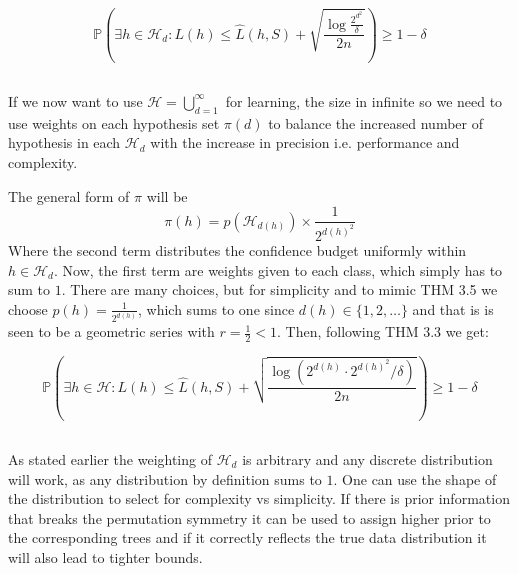 \documentclass[a4paper,12pt]{article}
\begin{document}
$$
\mathbb{P}\left( \exists h \in \mathcal{H}_d :   L(h) \leq \hat{L}(h,S) + 
\sqrt{
\frac{\log \frac{2^{d^2}}{\delta}}{2n}
} 
\right) \geq 1-\delta
$$



\subsection{} %

If we now want to use $\mathcal{H} = \bigcup_{d=1}^\infty$ for learning, the size in infinite so we need to use weights on each hypothesis set $\pi(d)$ to balance the increased number of hypothesis in each $\mathcal{H}_d$ with the increase in precision i.e. performance and complexity.

The general form of $\pi$ will be 
$$
\pi(h) = p\left( \mathcal{H}_{ d(h) } \right) \times \frac{1}{2^{d(h)^2}} 
$$
Where the second term distributes the confidence budget uniformly within $h \in \mathcal{H}_d$. Now, the first term are weights given to each class, which simply has to sum to $1$. There are many choices, but for simplicity and to mimic THM 3.5 we choose $p(h) = \frac{1}{2^{d(h)}}$, which sums to one since $d(h) \in \{1,2,\dots\}$ and that is is seen to be a geometric series with $r = \frac{1}{2} < 1$. Then, following THM 3.3 we get:

$$
\mathbb{P}\left( \exists h \in \mathcal{H}:   L(h) \leq \hat{L}(h,S) + 
\sqrt{
\frac{\log \left( 2^{d(h)} \cdot 2^{d(h)^2} /\delta  \right) }
{2n}
} 
\right) \geq 1-\delta
$$

\subsection{} %
As stated earlier the weighting of $\mathcal{H}_d$ is arbitrary and any discrete distribution will work, as any distribution by definition sums to $1$. One can use the shape of the distribution to select for complexity vs simplicity. If there is prior information that breaks the permutation symmetry it can be used to assign higher prior to the corresponding trees and if it correctly reflects the true data distribution it will also lead to tighter bounds.


\subsection{} %

\subsection{} %
\end{document}
